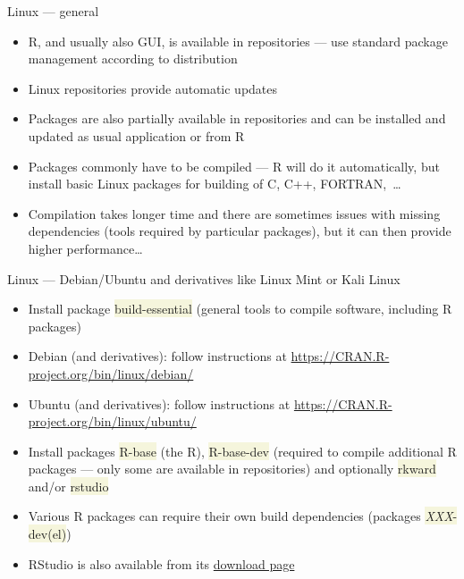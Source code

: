 \documentclass[compress, xelatex, 11pt, xcolor=svgnames, aspectratio=169, url={hyphens, lowtilde}]{beamer}
\renewcommand{\texttt}[1]{\colorbox{Beige}{{\ttfamily #1}}}
\begin{document}
\begin{frame}{Linux --- general}
	\begin{itemize}
		\item R, and usually also GUI, is available in repositories --- use standard package management according to distribution
		\item Linux repositories provide automatic updates
		\item Packages are also partially available in repositories and can be installed and updated as usual application or from R
		\item Packages commonly have to be compiled --- R will do it automatically, but install basic Linux packages for building of C, C++, FORTRAN,~\ldots
		\item Compilation takes longer time and there are sometimes issues with missing dependencies (tools required by particular packages), but it can then provide higher performance\ldots
	\end{itemize}
\end{frame}

\begin{frame}{Linux --- Debian/Ubuntu and derivatives like Linux Mint or Kali Linux}
	\begin{itemize}
		\item Install package \texttt{build-essential} (general tools to compile software, including R packages)
		\item Debian (and derivatives): follow instructions at \url{https://CRAN.R-project.org/bin/linux/debian/}
		\item Ubuntu (and derivatives): follow instructions at \url{https://CRAN.R-project.org/bin/linux/ubuntu/}
		\item Install packages \texttt{R-base} (the R), \texttt{R-base-dev} (required to compile additional R packages --- only some are available in repositories) and optionally \texttt{rkward} and/or \texttt{rstudio}
		\item Various R packages can require their own build dependencies (packages \texttt{\textit{XXX}-dev(el)})
		\item RStudio is also available from its \href{https://posit.co/products/open-source/rstudio/}{download page}
	\end{itemize}
\end{frame}
\end{document}
